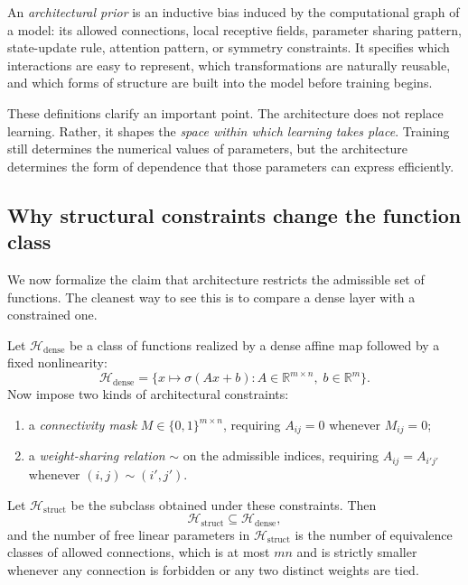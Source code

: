 \begin{definition}
An \emph{architectural prior} is an inductive bias induced by the computational graph of a model:
its allowed connections, local receptive fields, parameter sharing pattern, state-update rule, attention pattern, or symmetry constraints.
It specifies which interactions are easy to represent, which transformations are naturally reusable, and which forms of structure are built into the model before training begins.
\end{definition}

\medskip

These definitions clarify an important point.
The architecture does not replace learning.
Rather, it shapes the \emph{space within which learning takes place}.
Training still determines the numerical values of parameters, but the architecture determines the form of dependence that those parameters can express efficiently.

\subsection*{Why structural constraints change the function class}

We now formalize the claim that architecture restricts the admissible set of functions.
The cleanest way to see this is to compare a dense layer with a constrained one.

\begin{proposition}
Let $\mathcal{H}_{\mathrm{dense}}$ be a class of functions realized by a dense affine map followed by a fixed nonlinearity:
\[
\mathcal{H}_{\mathrm{dense}}
=
\bigl\{x \mapsto \sigma(Ax+b) : A \in \mathbb{R}^{m \times n},\; b \in \mathbb{R}^{m}\bigr\}.
\]
Now impose two kinds of architectural constraints:
\begin{enumerate}
    \item a \emph{connectivity mask} $M \in \{0,1\}^{m \times n}$, requiring $A_{ij}=0$ whenever $M_{ij}=0$;
    \item a \emph{weight-sharing relation} $\sim$ on the admissible indices, requiring $A_{ij}=A_{i'j'}$ whenever $(i,j) \sim (i',j')$.
\end{enumerate}
Let $\mathcal{H}_{\mathrm{struct}}$ be the subclass obtained under these constraints.
Then
\[
\mathcal{H}_{\mathrm{struct}} \subseteq \mathcal{H}_{\mathrm{dense}},
\]
and the number of free linear parameters in $\mathcal{H}_{\mathrm{struct}}$ is the number of equivalence classes of allowed connections, which is at most $mn$ and is strictly smaller whenever any connection is forbidden or any two distinct weights are tied.
\end{proposition}

